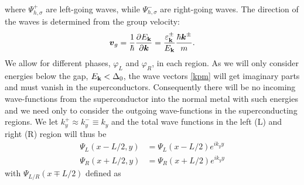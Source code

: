 where $\Psi^+_{h,\sigma}$ are left-going waves, while $\Psi^-_{h,\sigma}$ are right-going waves. The direction of the waves is determined from the group velocity:
\begin{equation}
    \boldsymbol{v}_g = \frac{1}{\hbar}\frac{\partial E_{\mathbf{k}}}{\partial \boldsymbol{k}} = \frac{\varepsilon_{\mathbf{k}}^{\pm}}{E_{\mathbf{k}}}\frac{\hbar\boldsymbol{k}^{\pm}}{m}.
\end{equation}
We allow for different phases, $\varphi_L$ and $\varphi_R$, in each region. As we will only consider energies below the gap, $E_{\mathbf{k}}<\Delta_0$, the wave vectors \eqref{kpm} will get imaginary parts and must vanish in the superconductors. Consequently there will be no incoming wave-functions from the superconductor into the normal metal with such energies and we need only to consider the outgoing wave-functions in the superconducting regions. We let $k_y^+ \approx k_y^- \equiv k_y$ and the total wave functions in the left (L) and right (R) region will thus be
\begin{equation}
\begin{split}
    \Psi_L(x-L/2,y) &= \Psi_L(x-L/2)e^{ik_yy}\\
    \Psi_R(x+L/2,y) &= \Psi_R(x+L/2)e^{ik_yy}
\end{split}
\end{equation}
with $\Psi_{L/R}(x\mp L/2)$ defined as 
